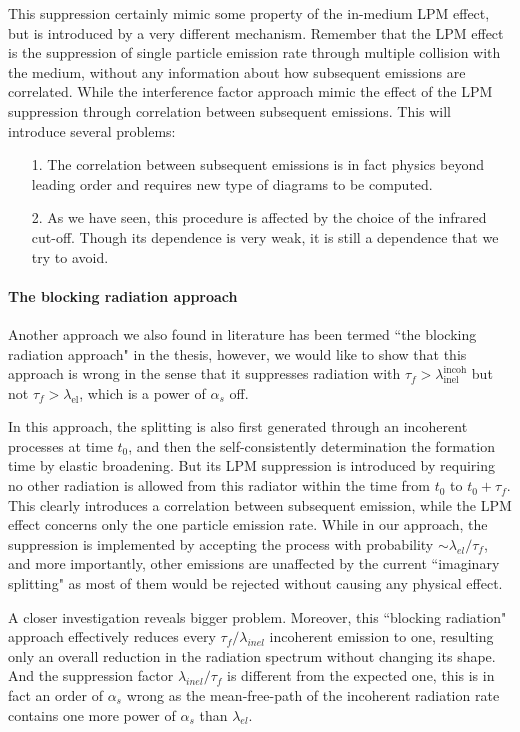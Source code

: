 This suppression certainly mimic some property of the in-medium LPM effect, but is introduced by a very different mechanism.
Remember that the LPM effect is the suppression of single particle emission rate through multiple collision with the medium, without any information about how subsequent emissions are correlated. 
While the interference factor approach mimic the effect of the LPM suppression through correlation between subsequent emissions.
This will introduce several problems: 
\begin{itemize}
\item[1.] The correlation between subsequent emissions is in fact physics beyond leading order and requires new type of diagrams to be computed.
\item[2.] As we have seen, this procedure is affected by the choice of the infrared cut-off. Though its dependence is very weak, it is still a dependence that we try to avoid.
\end{itemize}

\paragraph*{The blocking radiation approach}
Another approach we also found in literature has been termed ``the blocking radiation approach" in the thesis, however, we would like to show that this approach is wrong in the sense that it suppresses radiation with $\tau_f > \lambda_{\textrm{inel}}^{\textrm{incoh}}$ but not $\tau_f > \lambda_{\textrm{el}}$, which is a power of $\alpha_s$ off.

In this approach, the splitting is also first generated through an incoherent processes at time $t_0$, and then the self-consistently determination the formation time by elastic broadening. 
But its LPM suppression is introduced by requiring no other radiation is allowed from this radiator within the time from $t_0$ to $t_0 + \tau_f$.
This clearly introduces a correlation between subsequent emission, while the LPM effect concerns only the one particle emission rate.
While in our approach, the suppression is implemented by accepting the process with probability $\sim \lambda_{el}/\tau_f$, and more importantly, other emissions are unaffected by the current ``imaginary splitting" as most of them would be rejected without causing any physical effect.

A closer investigation reveals bigger problem.
Moreover, this ``blocking radiation" approach effectively reduces every $\tau_f/\lambda_{inel}$ incoherent emission to one, resulting only an overall reduction in the radiation spectrum without changing its shape.
And the suppression factor $\lambda_{inel}/\tau_f$ is different from the expected one, this is in fact an order of $\alpha_s$ wrong as the mean-free-path of the incoherent radiation rate contains one more power of $\alpha_s$ than $\lambda_{el}$.

